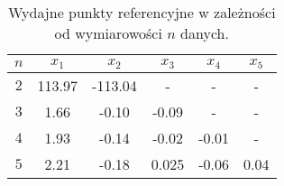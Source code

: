 \begin{table}[h]
	\centering
	\begin{tabular}{ c | c | c | c | c | c |}
		
		$ n $ & $ x_1 $ & $ x_2 $ & $ x_3 $ & $ x_4 $ & $ x_5 $ \\ \hline
		$ 2 $ & 113.97 & -113.04 & - & - & -  \\ \hline
		$ 3 $ & 1.66 & -0.10 & -0.09 & - & - \\ \hline
		$ 4 $ & 1.93 & -0.14 & -0.02 & -0.01 & - \\ \hline
		$ 5 $ & 2.21 & -0.18 & 0.025 & -0.06 & 0.04 \\ \hline
	\end{tabular}
	\caption{Wydajne punkty referencyjne w zależności od wymiarowości $ n $ danych.}\label{ti:eg-ref-p}
\end{table}